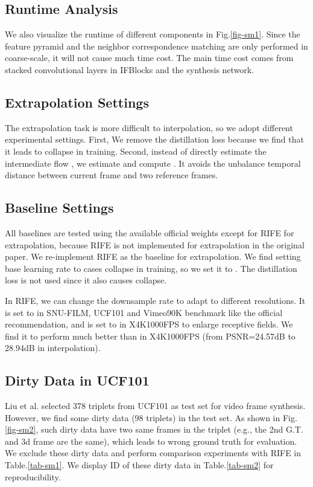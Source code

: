 \documentclass[sigconf]{acmart}
\begin{document}
\subsection{Runtime Analysis}

We also visualize the runtime of different components in Fig.\ref{fig-sm1}. Since the feature pyramid and the neighbor correspondence matching are only performed in coarse-scale, it will not cause much time cost. The main time cost comes from stacked convolutional layers in IFBlocks and the synthesis network.

\subsection{Extrapolation Settings}
The extrapolation task is more difficult to interpolation, so we adopt different experimental settings. First, We remove the distillation loss because we find that it leads to collapse in training. Second, instead of directly estimate the intermediate flow , we estimate  and compute . It avoids the unbalance temporal distance between current frame and two reference frames.

\subsection{Baseline Settings}
All baselines are tested using the available official weights except for RIFE for extrapolation, because RIFE is not implemented for extrapolation in the original paper. We re-implement RIFE as the baseline for extrapolation. We find setting base learning rate to  cases collapse in training, so we set it to . The distillation loss is not used since it also causes collapse.

In RIFE, we can change the downsample rate  to adapt to different resolutions. It is set to  in SNU-FILM, UCF101 and Vimeo90K benchmark like the official recommendation, and is set to  in X4K1000FPS to enlarge receptive fields. We find it to perform much better than  in X4K1000FPS (from PSNR=24.57dB to 28.94dB in interpolation). 


\subsection{Dirty Data in UCF101}

Liu et al.\cite{liu2017video} selected 378 triplets from UCF101 as test set for video frame synthesis. However, we find some dirty data (98 triplets) in the test set. As shown in Fig.\ref{fig-sm2}, such dirty data have two same frames in the triplet (e.g., the 2nd G.T. and 3d frame are the same), which leads to wrong ground truth for evaluation.
We exclude these dirty data and perform comparison experiments with RIFE in Table.\ref{tab-sm1}. We display ID of these dirty data in Table.\ref{tab-sm2} for reproducibility.
\end{document}
